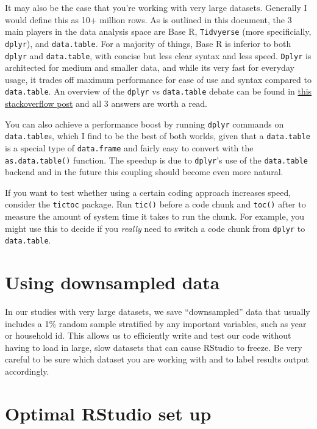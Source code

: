 \documentclass[]{book}
\begin{document}
It may also be the case that you're working with very large datasets.
Generally I would define this as 10+ million rows. As is outlined in
this document, the 3 main players in the data analysis space are Base R,
\texttt{Tidvyerse} (more specificially, \texttt{dplyr}), and
\texttt{data.table}. For a majority of things, Base R is inferior to
both \texttt{dplyr} and \texttt{data.table}, with concise but less clear
syntax and less speed. \texttt{Dplyr} is architected for medium and
smaller data, and while its very fast for everyday usage, it trades off
maximum performance for ease of use and syntax compared to
\texttt{data.table}. An overview of the \texttt{dplyr} vs
\texttt{data.table} debate can be found in
\href{https://stackoverflow.com/questions/21435339/data-table-vs-dplyr-can-one-do-something-well-the-other-cant-or-does-poorly/27840349\#27840349}{this
stackoverflow post} and all 3 answers are worth a read.

You can also achieve a performance boost by running \texttt{dplyr}
commands on \texttt{data.table}s, which I find to be the best of both
worlds, given that a \texttt{data.table} is a special type of
\texttt{data.frame} and fairly easy to convert with the
\texttt{as.data.table()} function. The speedup is due to
\texttt{dplyr}'s use of the \texttt{data.table} backend and in the
future this coupling should become even more natural.

If you want to test whether using a certain coding approach increases
speed, consider the \texttt{tictoc} package. Run \texttt{tic()} before a
code chunk and \texttt{toc()} after to measure the amount of system time
it takes to run the chunk. For example, you might use this to decide if
you \emph{really} need to switch a code chunk from \texttt{dplyr} to
\texttt{data.table}.

\section{Using downsampled data}\label{using-downsampled-data}

In our studies with very large datasets, we save ``downsampled'' data
that usually includes a 1\% random sample stratified by any important
variables, such as year or household id. This allows us to efficiently
write and test our code without having to load in large, slow datasets
that can cause RStudio to freeze. Be very careful to be sure which
dataset you are working with and to label results output accordingly.

\section{Optimal RStudio set up}\label{optimal-rstudio-set-up}
\end{document}
